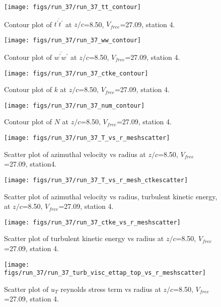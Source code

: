 \begin{figure}[H]
\centering
\texttt{[image: figs/run\_37/run\_37\_tt\_contour]}
\caption{Contour plot of $\overline{t^\prime t^\prime}$ at $z/c$=8.50, $V_{free}$=27.09, station 4.}
\end{figure}


\begin{figure}[H]
\centering
\texttt{[image: figs/run\_37/run\_37\_ww\_contour]}
\caption{Contour plot of $\overline{w^\prime w^\prime}$ at $z/c$=8.50, $V_{free}$=27.09, station 4.}
\end{figure}


\begin{figure}[H]
\centering
\texttt{[image: figs/run\_37/run\_37\_ctke\_contour]}
\caption{Contour plot of $k$ at $z/c$=8.50, $V_{free}$=27.09, station 4.}
\end{figure}


\begin{figure}[H]
\centering
\texttt{[image: figs/run\_37/run\_37\_num\_contour]}
\caption{Contour plot of $N$ at $z/c$=8.50, $V_{free}$=27.09, station 4.}
\end{figure}


\begin{figure}[H]
\centering
\texttt{[image: figs/run\_37/run\_37\_T\_vs\_r\_meshscatter]}
\caption{Scatter plot of azimuthal velocity vs radius at $z/c$=8.50, $V_{free}$=27.09, station4.}
\end{figure}


\begin{figure}[H]
\centering
\texttt{[image: figs/run\_37/run\_37\_T\_vs\_r\_mesh\_ctkescatter]}
\caption{Scatter plot of azimuthal velocity vs radius, turbulent kinetic energy, at $z/c$=8.50, $V_{free}$=27.09, station 4.}
\end{figure}


\begin{figure}[H]
\centering
\texttt{[image: figs/run\_37/run\_37\_ctke\_vs\_r\_meshscatter]}
\caption{Scatter plot of turbulent kinetic energy vs radius at $z/c$=8.50, $V_{free}$=27.09, station 4.}
\end{figure}


\begin{figure}[H]
\centering
\texttt{[image: figs/run\_37/run\_37\_turb\_visc\_ettap\_top\_vs\_r\_meshscatter]}
\caption{Scatter plot of $
u_T$ reynolds stress term vs radius at $z/c$=8.50, $V_{free}$=27.09, station 4.}
\end{figure}


